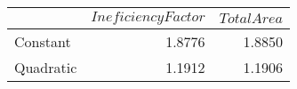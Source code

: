 \begin{tabular}{lrr}
\toprule
{} &  $Ineficiency Factor$ &  $TotalArea$ \\
\midrule
Constant  &                1.8776 &       1.8850 \\
Quadratic &                1.1912 &       1.1906 \\
\bottomrule
\end{tabular}
